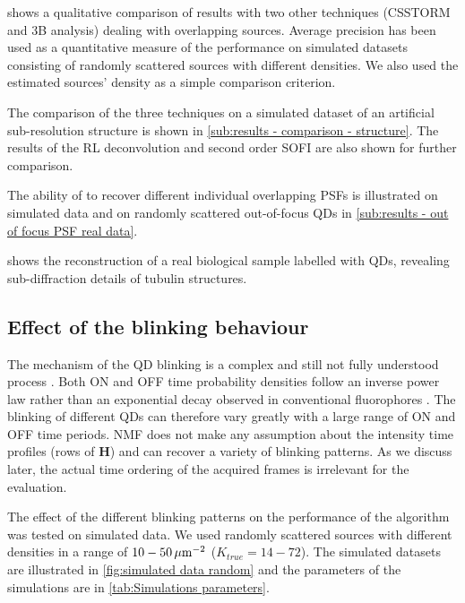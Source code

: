  shows a qualitative comparison of \inmf{} results with two other techniques (CSSTORM and 3B analysis) dealing with overlapping sources. Average precision has been used as a quantitative measure of the performance on simulated datasets consisting of randomly scattered sources with different densities. We also used the estimated sources' density as a simple comparison criterion. 

The comparison of the three techniques on a simulated dataset of an artificial sub-resolution structure is shown in \autoref{sub:results - comparison - structure}. The results of the RL deconvolution and second order SOFI are also shown for further comparison. 

The ability of \inmf{} to recover different individual overlapping PSFs is illustrated on simulated data and on randomly scattered out-of-focus QDs in \autoref{sub:results - out of focus PSF real data}.

 shows the \inmf{} reconstruction of a real biological sample labelled with QDs, revealing sub-diffraction details of tubulin structures.


\subsection{Effect of the blinking behaviour \label{sub:results - blinking behaviour}}
The mechanism of the QD blinking is a complex and still not fully understood process \cite{Stefani2009}. Both ON and OFF time probability densities follow an inverse power law rather than an exponential decay observed in conventional fluorophores \cite{Kuno2001}. The blinking of different QDs can therefore vary greatly with a large range of ON and OFF time periods. NMF does not make any assumption about the intensity time profiles (rows of $\bm{H}$) and can recover a variety of blinking patterns. As we discuss later, the actual time ordering of the acquired frames is irrelevant for the \inmf{} evaluation. 

The effect of the different blinking patterns on the performance of the \inmf{} algorithm was tested on simulated data. We used randomly scattered sources with different densities in a range of $10-50\, \mathrm{\mu m}^{-2}$ ($K_{true}=14-72$). The simulated datasets are illustrated in \autoref{fig:simulated data random} and the parameters of the simulations are in \autoref{tab:Simulations parameters}. 

